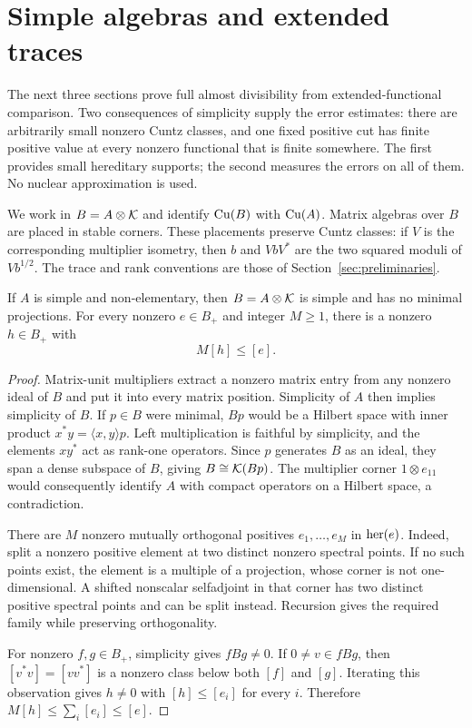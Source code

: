 \section{Simple algebras and extended traces}
\label{ext:sec:preliminaries}

The next three sections prove full almost divisibility from
extended-functional comparison. Two consequences of simplicity supply
the error estimates: there are arbitrarily small nonzero Cuntz classes,
and one fixed positive cut has finite positive value at every nonzero
functional that is finite somewhere. The first provides small hereditary
supports; the second measures the errors on all of them. No nuclear
approximation is used.

We work in $B=A\otimes\mathcal K$ and identify $\mathrm{Cu}(B)$ with $\mathrm{Cu}(A)$.
Matrix algebras over $B$ are placed in stable corners. These placements
preserve Cuntz classes: if $V$ is the corresponding multiplier isometry,
then $b$ and $VbV^*$ are the two squared moduli of $Vb^{1/2}$.
The trace and rank conventions are those of
Section~\ref{sec:preliminaries}.

\begin{lemma}
\label{ext:lem:small}
If $A$ is simple and non-elementary, then $B=A\otimes\mathcal K$ is simple
and has no minimal projections. For every nonzero $e\in B_+$ and
integer $M\ge1$, there is a nonzero $h\in B_+$ with
\[
 M[h]\le[e].
\]
\end{lemma}

\begin{proof}
Matrix-unit multipliers extract a nonzero matrix entry from any
nonzero ideal of $B$ and put it into every matrix position.
Simplicity of $A$ then implies simplicity of $B$.
If $p\in B$ were minimal, $Bp$ would be a Hilbert space with
inner product $x^*y=\langle x,y\rangle p$. Left multiplication
is faithful by simplicity, and the elements $xy^*$ act as rank-one
operators. Since $p$ generates $B$ as an ideal, they span a dense
subspace of $B$, giving $B\cong\mathcal K(Bp)$. The multiplier corner
$1\otimes e_{11}$ would consequently identify $A$ with compact
operators on a Hilbert space, a contradiction.

There are $M$ nonzero mutually orthogonal positives
$e_1,\ldots,e_M$ in $\operatorname{her}(e)$. Indeed, split a nonzero positive
element at two distinct nonzero spectral points. If no such points
exist, the element is a multiple of a projection, whose corner is
not one-dimensional. A shifted nonscalar selfadjoint in that corner
has two distinct positive spectral points and can be split instead.
Recursion gives the required family while preserving orthogonality.

For nonzero $f,g\in B_+$, simplicity gives $fBg\ne0$.
If $0\ne v\in fBg$, then $[v^*v]=[vv^*]$ is a nonzero class
below both $[f]$ and $[g]$. Iterating this observation gives
$h\ne0$ with $[h]\le[e_i]$ for every $i$. Therefore
$M[h]\le\sum_i[e_i]\le[e]$.
\end{proof}

